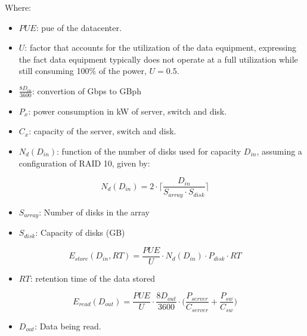 Where:
\begin{itemize}
    \item $PUE$: \ac{pue} of the datacenter.
    \item $U$: factor that accounts for the utilization of the data equipment, expressing the fact data equipment typically does not operate at a full utilization while still consuming 100\% of the power, $U = 0.5$.
    \item $\frac{8D_{in}}{3600}$: convertion of Gbps to GBph
    \item $P_x$: power consumption in kW of server, switch and disk.
    \item $C_x$: capacity of the server, switch and disk.
    \item $N_d(D_{in})$: function of the number of disks used for capacity $D_{in}$, assuming a configuration of RAID 10, given by: 
\end{itemize}

\begin{equation}
\label{formula:tall_datacenter_ndisks}
    N_d(D_{in}) = 2 \cdot \bigg \lceil \frac{D_{in}}{S_{array} \cdot S_{disk}} \bigg \rceil
\end{equation}

\begin{itemize}
    \item $S_{array}$: Number of disks in the array
    \item $S_{disk}$: Capacity of disks (GB)
\end{itemize}

\begin{equation}
\label{formula:tall_datacenter_store}
    E_{store}(D_{in}, RT) = \frac{PUE}{U} \cdot N_d(D_{in}) \cdot P_{disk} \cdot RT
\end{equation}

\begin{itemize}
    \item $RT$: retention time of the data stored
\end{itemize}

\begin{equation}
\label{formula:tall_datacenter_read}
    E_{read}(D_{out}) = \frac{PUE}{U} \cdot \frac{8D_{out}}{3600} \cdot \bigg(\frac{P_{server}}{C_{server}} + \frac{P_{sw}}{C_{sw}}  \bigg)
\end{equation}

\begin{itemize}
    \item $D_{out}$: Data being read.
\end{itemize}

